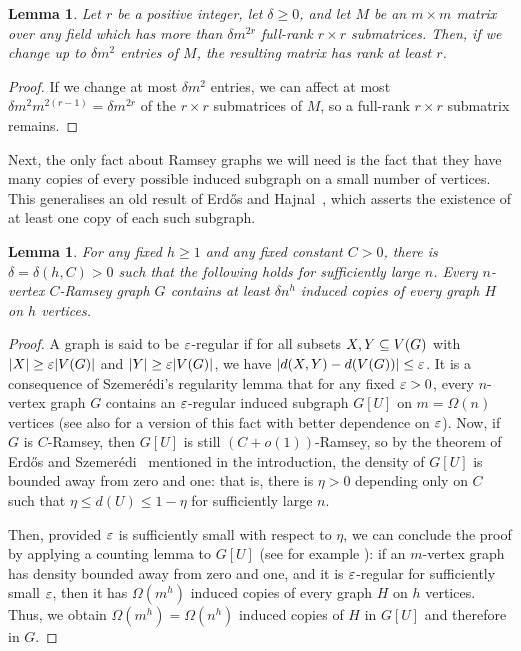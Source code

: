 \documentclass{daj}
\theoremstyle{plain}
\theoremstyle{plain}
\newtheorem{lem}[thm]{Lemma}
\theoremstyle{plain}
\theoremstyle{plain}
\theoremstyle{definition}
\theoremstyle{plain}
\theoremstyle{plain}
\theoremstyle{definition}
\theoremstyle{definition}
\theoremstyle{plain}
\begin{document}
\begin{lem}
\label{lem:many-full-rank}
Let $r$ be a positive integer, let $\delta\geq 0$, and let $M$ be an $m\times m$ matrix over any field which has more than $\delta m^{2r}$ full-rank $r\times r$ submatrices. Then, if we change up to $\delta m^2$ entries of $M$, the resulting matrix has rank at least $r$.
\end{lem}

\begin{proof}
If we change at most $\delta m^2$ entries, we can affect at most $\delta m^2 m^{2(r-1)}=\delta m^{2r}$ of the $r\times r$ submatrices of $M$, so a full-rank $r\times r$ submatrix remains.
\end{proof}

Next, the only fact about Ramsey graphs we will need is the fact that they have many copies of every possible induced subgraph on a small number of vertices. This generalises an old result of Erd\H{o}s and Hajnal~\cite{EH77}, which asserts the existence of at least one copy of each such subgraph.

\begin{lem}\label{lem-many-copies}
For any fixed $h\geq 1$ and any fixed constant $C>0$, there is $\delta=\delta(h,C)>0$ such that the following holds for sufficiently large $n$. Every $n$-vertex $C$-Ramsey graph $G$ contains at least $\delta n^h$ induced copies of every graph $H$ on $h$ vertices.
\end{lem}

\begin{proof}
A graph is said to be $\varepsilon$-regular if for all subsets $X, Y\subseteq V(G)$ with $\vert X\vert\geq \varepsilon \vert V(G)\vert$ and $\vert Y\vert\geq \varepsilon \vert V(G)\vert$, we have $|d(X,Y)-d(V(G))|\le\varepsilon$. It is a consequence of Szemer\'edi's regularity lemma that for any fixed $\varepsilon>0$, every $n$-vertex graph $G$ contains an $\varepsilon$-regular induced subgraph $G[U]$ on $m=\Omega(n)$ vertices (see also \cite[Lemma~5.2]{CF12} for a version of this fact with better dependence on $\varepsilon$). Now, if $G$ is $C$-Ramsey, then $G[U]$ is still $(C+o(1))$-Ramsey, so by the theorem of Erd\H{o}s and Szemer\'{e}di~\cite{ES72} mentioned in the introduction, the density of $G[U]$ is bounded away from zero and one: that is, there is $\eta>0$ depending only on $C$ such that $\eta\le d(U)\le 1-\eta$ for sufficiently large $n$.

Then, provided $\varepsilon$ is sufficiently small with respect to $\eta$, we can conclude the proof by applying a counting lemma to $G[U]$ (see for example \cite[Lemma 5.12]{CF12}): if an $m$-vertex graph has density bounded away from zero and one, and it is $\varepsilon$-regular for sufficiently small $\varepsilon$, then it has $\Omega(m^h)$ induced copies of every graph $H$ on $h$ vertices. Thus, we obtain $\Omega(m^h)=\Omega(n^h)$ induced copies of $H$ in $G[U]$ and therefore in $G$.
\end{proof}
\end{document}
